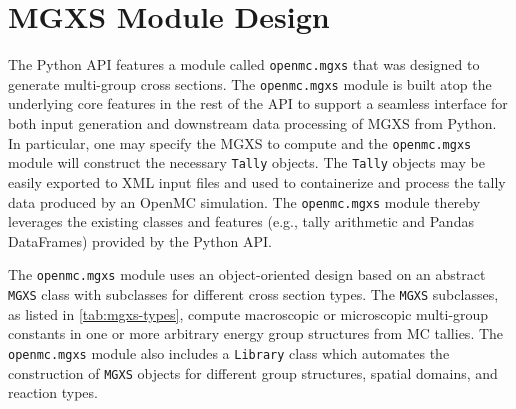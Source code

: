 \section{MGXS Module Design}
\label{sec:design}

The Python API features a module called \texttt{openmc.mgxs} that was designed to generate multi-group cross sections. The \texttt{openmc.mgxs} module is built atop the underlying core features in the rest of the API to support a seamless interface for both input generation and downstream data processing of MGXS from Python. In particular, one may specify the MGXS to compute and the \texttt{openmc.mgxs} module will construct the necessary \texttt{Tally} objects. The \texttt{Tally} objects may be easily exported to XML input files and used to containerize and process the tally data produced by an OpenMC simulation. The \texttt{openmc.mgxs} module thereby leverages the existing classes and features (e.g., tally arithmetic and Pandas DataFrames) provided by the Python API.

The \texttt{openmc.mgxs} module uses an object-oriented design based on an abstract \texttt{MGXS} class with subclasses for different cross section types. The \texttt{MGXS} subclasses, as listed in \cref{tab:mgxs-types}, compute macroscopic or microscopic multi-group constants in one or more arbitrary energy group structures from MC tallies. The \texttt{openmc.mgxs} module also includes a \texttt{Library} class which automates the construction of \texttt{MGXS} objects for different group structures, spatial domains, and reaction types.

